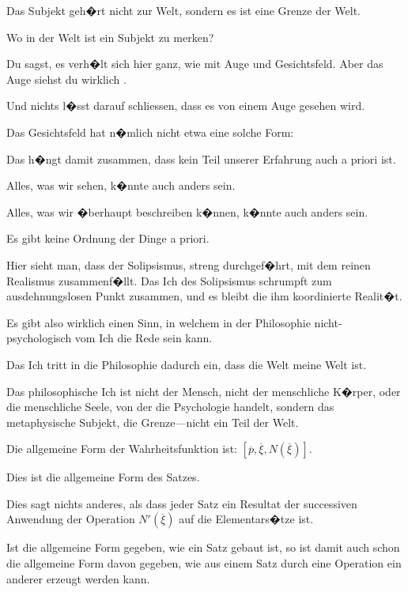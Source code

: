 {Das Subjekt geh�rt nicht zur Welt, sondern es
ist eine Grenze der Welt.}


{Wo in der Welt ist ein  Subjekt
zu merken?

Du sagst, es verh�lt sich hier ganz, wie mit Auge
und Gesichtsfeld. Aber das Auge siehst du wirklich
.

Und nichts  l�sst darauf
schliessen, dass es von einem Auge gesehen wird.}


{Das Gesichtsfeld hat n�mlich nicht etwa eine
solche Form:
}


{Das h�ngt damit zusammen, dass kein Teil
unserer Erfahrung auch a priori ist.

Alles, was wir sehen, k�nnte auch anders
sein.

Alles, was wir �berhaupt beschreiben k�nnen,
k�nnte auch anders sein.

Es gibt keine Ordnung der Dinge a priori.}


{Hier sieht man, dass der Solipsismus, streng
durchgef�hrt, mit dem reinen Realismus zusammenf�llt.
Das Ich des Solipsismus schrumpft zum
ausdehnungslosen Punkt zusammen, und es bleibt
die ihm koordinierte Realit�t.}


{Es gibt also wirklich einen Sinn, in welchem in
der Philosophie nicht-psy\-cho\-lo\-gisch vom Ich die
Rede sein kann.

Das Ich tritt in die Philosophie dadurch ein,
dass die \glqq{}Welt meine Welt ist\grqq{}.

{\verystretchyspace
Das philosophische Ich ist nicht der Mensch,
nicht der menschliche K�rper, oder die menschliche
Seele, von der die Psychologie handelt, sondern das
metaphysische Subjekt, die Grenze---nicht ein Teil
der Welt.}}


{Die allgemeine Form der Wahrheitsfunktion ist:
$[\overline{p}, \overline{\xi}, N(\overline{\xi})]$.

Dies ist die allgemeine Form des Satzes.}


{Dies sagt nichts anderes, als dass jeder Satz ein
Resultat der successiven Anwendung der Operation
$N'(\overline{\xi})$ auf die Elementars�tze ist.}


{Ist die allgemeine Form gegeben, wie ein Satz
gebaut ist, so ist damit auch schon die allgemeine
Form davon gegeben, wie aus einem Satz durch
eine Operation ein anderer erzeugt werden
kann.}


